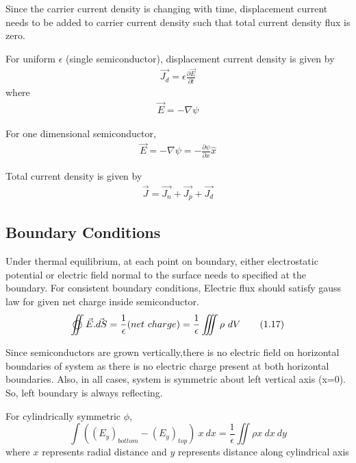 Since the carrier current density is changing with time, displacement current needs to be added to carrier current density such that total current density flux is zero.

For uniform $\epsilon$ (single semiconductor), displacement current density is given by
\begin{align*}
\vec{J_d} = \epsilon \frac{\partial \vec{E}}{\partial t}
\end{align*}
where
\begin{align*}
\vec{E} = -\nabla{\psi} 
\end{align*}

For one dimensional semiconductor, 
\begin{align*}
\vec{E} = -\nabla{\psi} = -\frac{\partial{\psi}}{\partial x} \hat{x} 
\end{align*}

Total current density is given by
\begin{align*}
\vec{J} = \vec{J_n} + \vec{J_p} + \vec{J_d}
\end{align*}

\subsection{Boundary Conditions}

Under thermal equilibrium, at each point on boundary, either electrostatic potential or electric field normal to the surface needs to specified at the boundary. For consistent boundary conditions, Electric flux should satisfy gauss law for given net charge inside semiconductor. 
\begin{equation}
   \varoiint \vec{E}.\vec{dS} =  \frac{1}{\epsilon} (net\ charge) = \frac{1}{\epsilon} \iiint \rho\ dV \tag{1.17} \label{eq:14}
\end{equation}

Since semiconductors are grown vertically,there is no electric field on horizontal boundaries of system as there is no electric charge present at both horizontal boundaries. Also, in all cases, system is symmetric about left vertical axis (x=0). So, left boundary is always reflecting.

For cylindrically symmetric $\phi$,
\begin{equation}
\int ((E_y)_{bottom} - (E_y)_{top})\ x \ dx  = \frac{1}{\epsilon} \iint \rho x\ dx\ dy \tag{1.18}\label{eq:15}
\end{equation}
where $x$ represents radial distance and $y$ represents distance along cylindrical axis

